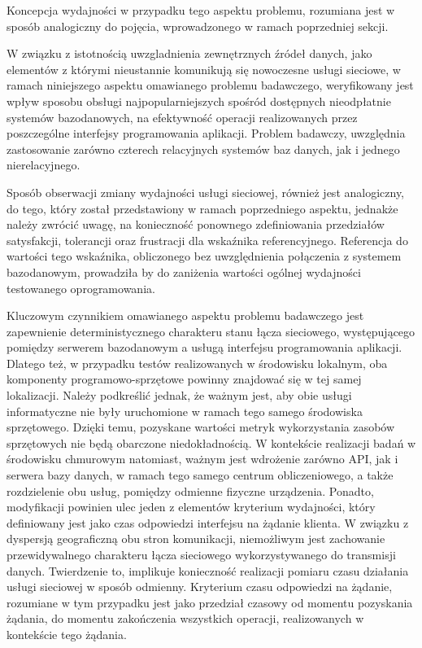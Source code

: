 Koncepcja wydajności w przypadku tego aspektu problemu, rozumiana jest w sposób analogiczny do pojęcia, wprowadzonego w ramach poprzedniej sekcji.

W związku z istotnością uwzgladnienia zewnętrznych źródeł danych, jako elementów z którymi nieustannie komunikują się nowoczesne usługi sieciowe, w ramach niniejszego aspektu omawianego problemu badawczego, weryfikowany jest wpływ sposobu obsługi najpopularniejszych spośród dostępnych nieodpłatnie systemów bazodanowych, na efektywność operacji realizowanych przez poszczególne interfejsy programowania aplikacji. Problem badawczy, uwzględnia zastosowanie zarówno czterech relacyjnych systemów baz danych, jak i jednego nierelacyjnego. 

Sposób obserwacji zmiany wydajności usługi sieciowej, również jest analogiczny, do tego, który został przedstawiony w ramach poprzedniego aspektu, jednakże należy zwrócić uwagę, na konieczność ponownego zdefiniowania przedziałów satysfakcji, tolerancji oraz frustracji dla wskaźnika referencyjnego. Referencja do wartości tego wskaźnika, obliczonego bez uwzględnienia połączenia z systemem bazodanowym, prowadziła by do zaniżenia wartości ogólnej wydajności testowanego oprogramowania.

Kluczowym czynnikiem omawianego aspektu problemu badawczego jest zapewnienie deterministycznego charakteru stanu łącza sieciowego, występującego pomiędzy serwerem bazodanowym a usługą interfejsu programowania aplikacji. Dlatego też, w przypadku testów realizowanych w środowisku lokalnym, oba komponenty programowo-sprzętowe powinny znajdować się w tej samej lokalizacji. Należy podkreślić jednak, że ważnym jest, aby obie usługi informatyczne nie były uruchomione w ramach tego samego środowiska sprzętowego. Dzięki temu, pozyskane wartości metryk wykorzystania zasobów sprzętowych nie będą obarczone niedokładnością. W kontekście realizacji badań w środowisku chmurowym natomiast, ważnym jest wdrożenie zarówno API, jak i serwera bazy danych, w ramach tego samego centrum obliczeniowego, a także rozdzielenie obu usług, pomiędzy odmienne fizyczne urządzenia. Ponadto, modyfikacji powinien ulec jeden z elementów kryterium wydajności, który definiowany jest jako czas odpowiedzi interfejsu na żądanie klienta. W związku z dyspersją geograficzną obu stron komunikacji, niemożliwym jest zachowanie przewidywalnego charakteru łącza sieciowego wykorzystywanego do transmisji danych. Twierdzenie to, implikuje konieczność realizacji pomiaru czasu działania usługi sieciowej w sposób odmienny. Kryterium czasu odpowiedzi na żądanie, rozumiane w tym przypadku jest jako przedział czasowy od momentu pozyskania żądania, do momentu zakończenia wszystkich operacji, realizowanych w kontekście tego żądania. 
